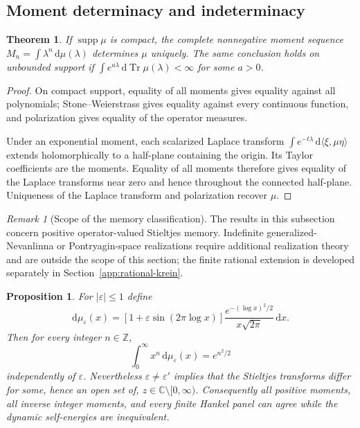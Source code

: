 \documentclass[11pt]{article}
\newtheorem{theorem}{Theorem}[section]
\newtheorem{proposition}[proposition]{Proposition}
\theoremstyle{definition}
\theoremstyle{remark}
\newtheorem{remark}[remark]{Remark}
\theoremstyle{definition}
\theoremstyle{remark}
\newcommand{\dd}{\mathrm d}
\newcommand{\Tr}{\operatorname{Tr}}
\newcommand{\supp}{\operatorname{supp}}
\begin{document}
\subsection{Moment determinacy and indeterminacy}

\begin{theorem}
\label{thm:supp-memory-determinacy}
If $\supp\mu$ is compact, the complete nonnegative moment sequence
$M_n=\int\lambda^n\,\dd\mu(\lambda)$ determines $\mu$ uniquely.  The same
conclusion holds on unbounded support if
$\int e^{a\lambda}\,\dd\Tr\mu(\lambda)<\infty$ for some $a>0$.
\end{theorem}

\begin{proof}
On compact support, equality of all moments gives equality against all
polynomials; Stone--Weierstrass gives equality against every continuous
function, and polarization gives equality of the operator measures.

Under an exponential moment, each scalarized Laplace transform
$\int e^{-t\lambda}\,\dd\langle\xi,\mu\eta\rangle$ extends holomorphically to
a half-plane containing the origin.  Its Taylor coefficients are the moments.
Equality of all moments therefore gives equality of the Laplace transforms
near zero and hence throughout the connected half-plane.  Uniqueness of the
Laplace transform and polarization recover $\mu$.
\end{proof}

\begin{remark}[Scope of the memory classification]
The results in this subsection concern positive operator-valued Stieltjes memory.
Indefinite generalized-Nevanlinna or Pontryagin-space realizations require
additional realization theory and are outside the scope of this section; the finite rational extension is developed separately in Section~\ref{app:rational-krein}.
\end{remark}

\begin{proposition}
\label{cth:supp-moment-indeterminate}
For $|\varepsilon|\le1$ define
\begin{equation}
 {
 \dd\mu_\varepsilon(x)
 =
 \left[1+\varepsilon\sin(2\pi\log x)\right]
 \frac{e^{-(\log x)^2/2}}{x\sqrt{2\pi}}\,\dd x.}
 \label{eq:supp-lognormal-family}
\end{equation}
Then for every integer $n\in\mathbb Z$,
\begin{equation}
 {
 \int_0^\infty x^n\,\dd\mu_\varepsilon(x)=e^{n^2/2}}
 \label{eq:supp-lognormal-moments}
\end{equation}
independently of $\varepsilon$.  Nevertheless
$\varepsilon\ne\varepsilon'$ implies that the Stieltjes transforms differ for
some, hence an open set of, $z\in\mathbb C\setminus[0,\infty)$.  Consequently
all positive moments, all inverse integer moments, and every finite Hankel
panel can agree while the dynamic self-energies are inequivalent.
\end{proposition}
\end{document}
